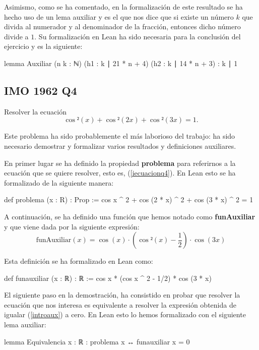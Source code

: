 Asimismo, como se ha comentado, en la formalización de este resultado se
ha hecho uso de un lema auxiliar y es el que nos dice que si existe un
número \(k\) que divida al numerador y al denominador de la fracción,
entonces dicho número divide a \(1\). Su formalización en Lean ha sido
necesaria para la conclusión del ejercicio y es la siguiente:
\begin{leancode}
lemma Auxiliar
  (n k : ℕ)
  (h1 : k ∣ 21 * n + 4)
  (h2 : k ∣ 14 * n + 3)
  : k ∣ 1
\end{leancode}

\subsection*{IMO 1962 Q4}

\noindent
Resolver la ecuación
\begin{equation}\label{iecuacionq4}
  \cos²(x)+\cos²(2x)+\cos²(3x)=1.
\end{equation}

Este problema ha sido probablemente el más laborioso del trabajo: ha
sido necesario demostrar y formalizar varios resultados y definiciones
auxiliares.

En primer lugar se ha definido la propiedad \textbf{problema} para
referirnos a la ecuación que se quiere resolver, esto es,
(\ref{iecuacionq4}). En Lean esto se ha formalizado de la siguiente
manera:
\begin{leancode}
def problema (x : R) : Prop :=
  cos x ^ 2 + cos (2 * x) ^ 2 + cos (3 * x) ^ 2 = 1
\end{leancode}

A continuación, se ha definido una función que hemos notado como
\textbf{funAuxiliar} y que viene dada por la siguiente expresión:
\begin{equation}\label{introaux}
  \text{funAuxiliar}(x)=\cos(x)·\left(\cos²(x)-\frac{1}{2}\right)·\cos(3x)
\end{equation}

Esta definición se ha formalizado en Lean como:
\begin{leancode}
def funauxiliar (x : ℝ) : ℝ :=
  cos x * (cos x ^ 2 - 1/2) * cos (3 * x)
\end{leancode}

El siguiente paso en la demostración, ha consistido en probar que
resolver la ecuación que nos interesa es equivalente a resolver la
expresión obtenida de igualar (\ref{introaux}) a cero. En Lean esto lo
hemos formalizado con el siguiente lema auxiliar:
\begin{leancode}
lemma Equivalencia
  {x : ℝ}
  : problema x ↔ funauxiliar x = 0
\end{leancode}

